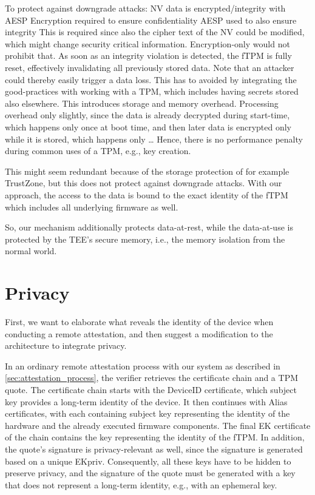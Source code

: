
To protect against downgrade attacks:
NV data is encrypted/integrity with AESP
Encryption required to ensure confidentiality
AESP used to also ensure integrity
This is required since also the cipher text of the NV could be modified, which might change security critical information.
Encryption-only would not prohibit that.
As soon as an integrity violation is detected, the \ac{fTPM} is fully reset, effectively invalidating all previously stored data.
Note that an attacker could thereby easily trigger a data loss.
This has to avoided by integrating the good-practices with working with a \ac{TPM}, which includes having secrets stored also elsewhere. %
This introduces storage and memory overhead.
Processing overhead only slightly, since the data is already decrypted during start-time, which happens only once at boot time, and then later data is encrypted only while it is stored, which happens only \ldots %
Hence, there is no performance penalty during common uses of a \ac{TPM}, e.g., key creation.

This might seem redundant because of the storage protection of for example TrustZone, but this does not protect against downgrade attacks. With our approach, the access to the data is bound to the exact identity of the fTPM which includes all underlying firmware as well.

So, our mechanism additionally protects data-at-rest, while the data-at-use is protected by the TEE's secure memory, i.e., the memory isolation from the normal world.


\section{Privacy}\label{sec:privacy}

First, we want to elaborate what reveals the identity of the device when conducting a remote attestation, and then suggest a modification to the architecture to integrate privacy.

In an ordinary remote attestation process with our system as described in \autoref{sec:attestation_process}, the verifier retrieves the certificate chain and a TPM quote.
The certificate chain starts with the DeviceID certificate, which subject key provides a long-term identity of the device.
It then continues with Alias certificates, with each containing subject key representing the identity of the hardware and the already executed firmware components.
The final EK certificate of the chain contains the key representing the identity of the fTPM\@.
In addition, the quote's signature is privacy-relevant as well, since the signature is generated based on a unique EKpriv.
Consequently, all these keys have to be hidden to preserve privacy, and the signature of the quote must be generated with a key that does not represent a long-term identity, e.g., with an ephemeral key.

